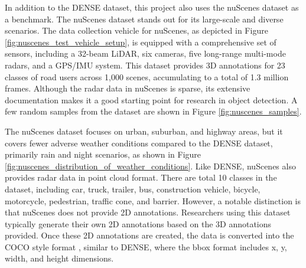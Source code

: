 \documentclass[report.tex]{subfiles}
\begin{document}
    In addition to the DENSE dataset, this project also uses the nuScenes dataset \cite{caesar2020nuscenes} as a benchmark. The nuScenes dataset stands out for its large-scale and diverse scenarios. The data collection vehicle for nuScenes, as depicted in Figure \ref{fig:nuscenes_test_vehicle_setup}, is equipped with a comprehensive set of sensors, including a 32-beam LiDAR, six cameras, five long-range multi-mode radars, and a GPS/IMU system. This dataset provides 3D annotations for 23 classes of road users across 1,000 scenes, accumulating to a total of 1.3 million frames. Although the radar data in nuScenes is sparse, its extensive documentation makes it a good starting point for research in object detection. A few random samples from the dataset are shown in Figure \ref{fig:nuscenes_samples}.

    The nuScenes dataset focuses on urban, suburban, and highway areas, but it covers fewer adverse weather conditions compared to the DENSE dataset, primarily rain and night scenarios, as shown in Figure \ref{fig:nuscenes_distribution_of_weather_conditions}. Like DENSE, nuScenes also provides radar data in point cloud format. There are total 10 classes in the dataset, including car, truck, trailer, bus, construction vehicle, bicycle, motorcycle, pedestrian, traffic cone, and barrier. However, a notable distinction is that nuScenes does not provide 2D annotations. Researchers using this dataset typically generate their own 2D annotations based on the 3D annotations provided. Once these 2D annotations are created, the data is converted into the COCO style format \cite{lin2014microsoft}, similar to DENSE, where the bbox format includes x, y, width, and height dimensions.



\end{document}
